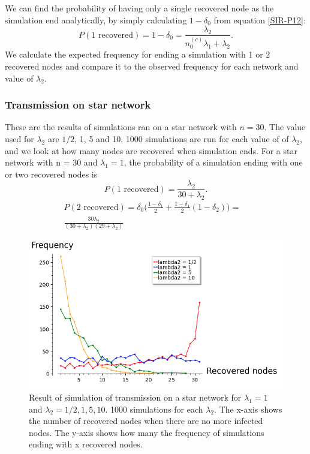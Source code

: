 \documentclass[12pt]{article} %
\numberwithin{equation}{section}
\begin{document}
We can find the probability of having only a single recovered node as the simulation end analytically, by simply calculating $1-\delta_0$ from equation \ref{SIR-P12}:
\begin{equation}\label{bara1}
    P(\text{1 recovered}) = 1-\delta_0 = \frac{\lambda_2}{n_0^{(c)}\lambda_1+\lambda_2}.
\end{equation}
We calculate the expected frequency for ending a simulation with 1 or 2 recovered nodes and compare it to the observed frequency for each network and value of $\lambda_2$.

\subsubsection{Transmission on star network}\label{simsirstarsec}
These are the results of simulations ran on a star network with $n=30$. The value used for $\lambda_2$ are $1/2$, 1, 5 and 10. 1000 simulations are run for each value of of $\lambda_2$, and we look at how many nodes are recovered when simulation ends. For a star network with n = 30 and $\lambda_1 = 1$, the probability of a simulation ending with one or two recovered nodes is
\begin{equation}\label{bara1star}
    P(\text{1 recovered}) = \frac{\lambda_2}{30+\lambda_2}.
\end{equation}
\begin{align}\label{bara2star}
    P(\text{2 recovered}) = \delta_0\Big(\frac{1-\delta_1}{2}+\frac{1-\delta_1}{2}(1-\delta_2)\Big) = & \\ \frac{30\lambda_2}{(30+\lambda_2){(29+\lambda_2)}}
\end{align}
\begin{figure}[H]
    \centering
    \includegraphics[scale=0.7]{starSIR.png}   
    \caption{Result of simulation of transmission on a star network for $\lambda_1 = 1$ and $\lambda_2 = 1/2,1,5,10$. 1000 simulations for each $\lambda_2$. The x-axis shows the number of recovered nodes when there are no more infected nodes. The y-axis shows how many the frequency of simulations ending with x recovered nodes.}
    \label{starsirplot}
\end{figure}
\end{document}
